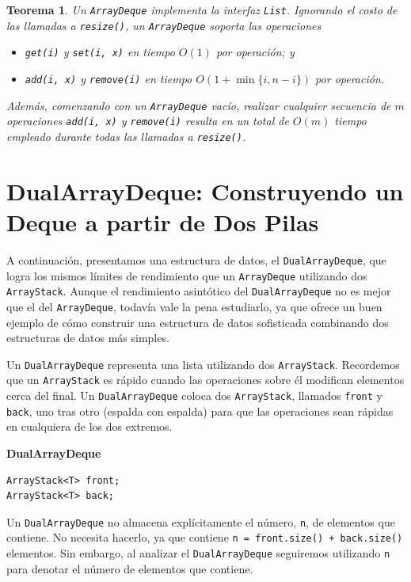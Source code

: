 \documentclass[11pt]{book}
\theoremstyle{plain}
\newtheorem{teorema}{Teorema}[chapter]
\newcommand{\claseheader}[1]{\noindent\textbf{#1}\par\vspace{-4pt}}
\begin{document}
\begin{teorema}
Un \texttt{ArrayDeque} implementa la interfaz \texttt{List}. Ignorando el costo de las llamadas a \texttt{resize()}, un \texttt{ArrayDeque} soporta las operaciones

\begin{itemize}
    \item \texttt{get(i)} y \texttt{set(i, x)} en tiempo $O(1)$ por operación; y
    \item \texttt{add(i, x)} y \texttt{remove(i)} en tiempo $O(1 + \min\{i, n - i\})$ por operación.
\end{itemize}

Además, comenzando con un \texttt{ArrayDeque} vacío, realizar cualquier secuencia de $m$ operaciones \texttt{add(i, x)} y \texttt{remove(i)} resulta en un total de $O(m)$ tiempo empleado durante todas las llamadas a \texttt{resize()}.
\end{teorema}

\section{DualArrayDeque: Construyendo un Deque a partir de Dos Pilas}

A continuación, presentamos una estructura de datos, el \texttt{DualArrayDeque}, que logra los mismos límites de rendimiento que un \texttt{ArrayDeque} utilizando dos \texttt{ArrayStack}. Aunque el rendimiento asintótico del \texttt{DualArrayDeque} no es mejor que el del \texttt{ArrayDeque}, todavía vale la pena estudiarlo, ya que ofrece un buen ejemplo de cómo construir una estructura de datos sofisticada combinando dos estructuras de datos más simples.

Un \texttt{DualArrayDeque} representa una lista utilizando dos \texttt{ArrayStack}. Recordemos que un \texttt{ArrayStack} es rápido cuando las operaciones sobre él modifican elementos cerca del final. Un \texttt{DualArrayDeque} coloca dos \texttt{ArrayStack}, llamados \texttt{front} y \texttt{back}, uno tras otro (espalda con espalda) para que las operaciones sean rápidas en cualquiera de los dos extremos.

\claseheader{DualArrayDeque}
\begin{lstlisting}
ArrayStack<T> front;
ArrayStack<T> back;
\end{lstlisting}

Un \texttt{DualArrayDeque} no almacena explícitamente el número, \texttt{n}, de elementos que contiene. No necesita hacerlo, ya que contiene \texttt{n = front.size() + back.size()} elementos. Sin embargo, al analizar el \texttt{DualArrayDeque} seguiremos utilizando \texttt{n} para denotar el número de elementos que contiene.
\end{document}
